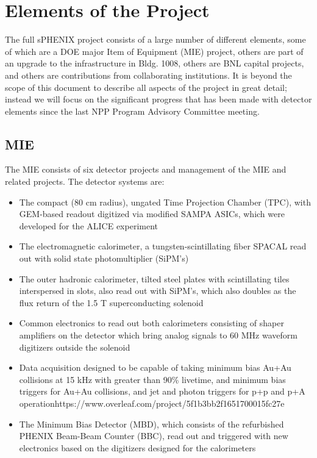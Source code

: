 \section{Elements of the Project}
\label{sec:elements}

The full sPHENIX project consists of a large number of different
elements, some of which are a DOE major Item of Equipment (MIE) project,
others are part of an
upgrade to the infrastructure in Bldg. 1008, others are BNL capital
projects, and others are contributions from collaborating
institutions.  It is beyond the scope of this document to describe all
aspects of the project in great detail; instead we will focus on
the significant progress that has been made with detector elements
since the last NPP Program Advisory Committee meeting.

\subsection{MIE}

The MIE consists of six detector projects and management of the
MIE and related projects.
The detector systems are:

\begin{itemize}
    \item The compact (80 cm radius), ungated Time Projection Chamber (TPC), with GEM-based readout digitized via modified SAMPA ASICs, which were developed for the ALICE experiment
    \item The electromagnetic calorimeter, a tungsten-scintillating fiber
    SPACAL read out with solid state photomultiplier (SiPM's)
    \item The outer hadronic calorimeter, tilted steel plates with scintillating tiles
    interspersed in slots, also read out with SiPM's, which also doubles
    as the flux return of the 1.5 T superconducting solenoid
    \item Common electronics to read out both calorimeters consisting of
    shaper amplifiers on the detector which bring analog signals to 60 MHz waveform digitizers outside the solenoid
    \item Data acquisition designed to be capable of taking minimum bias
    Au+Au collisions at 15 kHz with greater than 90\% livetime, and minimum bias triggers for Au+Au collisions, and jet and photon triggers for p+p and p+A operationhttps://www.overleaf.com/project/5f1b3bb2f1651700015fc27e
    \item The Minimum Bias Detector (MBD), which consists of the refurbished PHENIX Beam-Beam Counter (BBC), read out and triggered with new electronics based on the digitizers designed for the calorimeters
\end{itemize}

